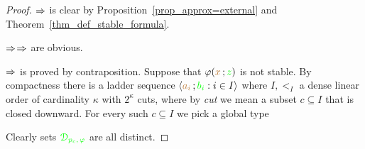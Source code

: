 \documentclass[creche.tex]{subfiles}
\begin{document}
\begin{proof}
$\Rightarrow$ is clear by Proposition~\ref{prop_approx=external} and Theorem~\ref{thm_def_stable_formula}.

$\Rightarrow$$\Rightarrow$ are obvious.

$\Rightarrow$ is proved by contraposition.
Suppose that $\varphi({\color{brown} x}\,;{\color{green} z})$ is not stable.
By compactness there is a ladder sequence  $\langle{\color{brown}a_i}\,;{\color{green} b_i} : i\in I\rangle$ where $I,<_I$ a dense linear order of cardinality $\kappa$ with $2^\kappa$ cuts, where by \textit{cut\/} we mean a subset $c\subseteq I$ that is closed downward.
For every such $c\subseteq I$ we pick a global type


Clearly sets ${\color{green}\EuScript D_{p_c,\,\varphi} }$ are all distinct.
\end{proof}




\end{document}
